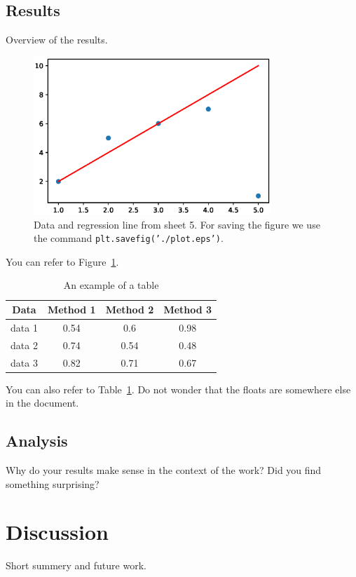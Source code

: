 \documentclass[a4paper,12pt]{article}
\newcommand{\initials}[1]{\marginpar{\quad\texttt{#1}}}
\begin{document}
\subsection{Results}
Overview of the results.
\initials{SGM}


\begin{figure}[h]
\centering
\includegraphics[width=0.8\textwidth]{plot}
\caption{Data and regression line from sheet 5. For saving the figure we use the command \texttt{plt.savefig('./plot.eps')}.}
\label{fig_res}
\end{figure}


You can refer to Figure~\ref{fig_res}.
\begin{table}[h]
\caption{An example of a table}
\label{tab_example}
\centering
\begin{tabular}{c||c|c|c}
Data & Method 1 & Method 2 & Method 3\\
\hline\hline
data 1 &0.54 & 0.6& 0.98\\
\hline
data 2 &0.74 & 0.54& 0.48\\
\hline
data 3 &0.82 & 0.71& 0.67
\end{tabular}
\end{table}
You can also refer to Table~\ref{tab_example}. Do not wonder that the floats are somewhere else in the document.
\initials{FGM}

\subsection{Analysis}
Why do your results make sense in the context of the work? Did you find something surprising?

\section{Discussion}
Short summery and future work.
\initials{SGM/TGM}
\end{document}
